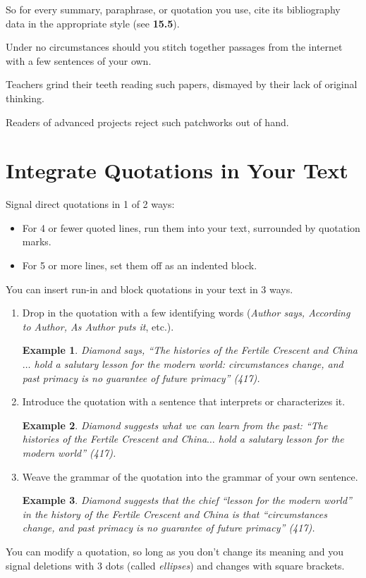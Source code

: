 \documentclass[oneside]{book}
\numberwithin{equation}{section}
\newtheorem{example}{Example}[section]
\begin{document}
So for every summary, paraphrase, or quotation you use, cite its bibliography data in the appropriate style (see \textbf{15.5}).

Under no circumstances should you stitch together passages from the internet with a few sentences of your own.

Teachers grind their teeth reading such papers, dismayed by their lack of original thinking.

Readers of advanced projects reject such patchworks out of hand.

\section{Integrate Quotations in Your Text}
Signal direct quotations in 1 of 2 ways:
\begin{itemize}
    \item For 4 or fewer quoted lines, run them into your text, surrounded by quotation marks.
    \item For 5 or more lines, set them off as an indented block.
\end{itemize}
You can insert run-in and block quotations in your text in 3 ways.
\begin{enumerate}
    \item Drop in the quotation with a few identifying words (\textit{Author says, According to Author, As Author puts it}, etc.).
    \begin{example}
        Diamond says, ``The histories of the Fertile Crescent and China$\ldots$ hold a salutary lesson for the modern world: circumstances change, and past primacy is no guarantee of future primacy'' (417).
    \end{example}
    \item Introduce the quotation with a sentence that interprets or characterizes it.
    \begin{example}
        Diamond suggests what we can learn from the past: ``The histories of the Fertile Crescent and China$\ldots$ hold a salutary lesson for the modern world'' (417).
    \end{example}
    \item Weave the grammar of the quotation into the grammar of your own sentence.
    \begin{example}
        Diamond suggests that the chief ``lesson for the modern world'' in the history of the Fertile Crescent and China is that ``circumstances change, and past primacy is no guarantee of future primacy'' (417).
    \end{example}
\end{enumerate}
You can modify a quotation, so long as you don't change its meaning and you signal deletions with 3 dots (called \textit{ellipses}) and changes with square brackets.
\end{document}
